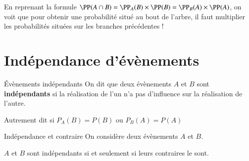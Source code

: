 \documentclass[oneside,12pt]{article}          %
\begin{document}
\begin{astuce}
	En reprenant la formule $\PP(A \cap B) = \PP_A(B) \times \PP(B) = \PP_B(A) \times \PP(A)$, on voit que pour obtenir une probabilité situé au bout de l'arbre, il faut multiplier les probabilités situées sur les branches précédentes !
\end{astuce}



\section{Indépendance d'évènements}

\begin{definition}{Évènements indépendants}
	On dit que deux évènements $A$ et $B$ sont \textbf{indépendants} si la réalisation de l'un n'a pas d'influence sur la réalisation de l'autre.
	
	Autrement dit si $P_A(B)=P(B)$ \quad ou \quad $P_B(A)=P(A)$
\end{definition}



\begin{propriete}{Indépendance et contraire}
	On considère deux évènements $A$ et $B$. 
	
	$A$ et $B$ sont indépendants si et seulement si leurs contraires le sont.
\end{propriete}
\end{document}
